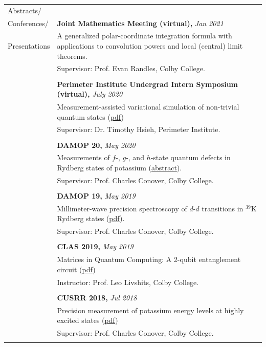 \documentclass[10pt]{article}
\begin{document}
\begin{longtable}{ l p{14.7cm}   }
\large{Abstracts/}   	& \\
\large{Conferences/}	& \textbf{Joint Mathematics Meeting (virtual),} \textit{Jan 2021}\\
\large{Presentations}	& A generalized polar-coordinate integration formula with applications to convolution powers and local (central) limit theorems.\\
	& Supervisor: Prof. Evan Randles, Colby College. \\
	&\\
	& \textbf{Perimeter Institute Undergrad Intern Symposium (virtual),} \textit{July 2020}\\
	& Measurement-assisted variational simulation of non-trivial quantum states (\href{https://huanqbui.com/LaTeX 20projects/HuanBui_Perimeter/Presentation/MBQC_as_Simulation.pdf}{{pdf}})\\
& Supervisor: Dr. Timothy Hsieh, Perimeter Institute. \\
	&\\
	& \textbf{DAMOP 20,} \textit{May 2020}\\
	& Measurements of $f$-, $g$-, and $h$-state quantum defects in Rydberg states of potassium (\href{http://meetings.aps.org/Meeting/DAMOP20/Session/K01.17}{abstract}).\\
	& Supervisor: Prof. Charles Conover, Colby College.\\
	&\\
	& \textbf{DAMOP 19,} \textit{May 2019} \\
	& Millimeter-wave precision spectroscopy of $d$-$d$ transitions in $^{\text{39}}$K Rydberg states (\href{https://huanqbui.com/research/DAMOP19 20poster/DAMOP19.pdf}{{pdf}}).\\
	& Supervisor: Prof. Charles Conover, Colby College.\\
	& \\
	& \textbf{CLAS 2019,} \textit{May 2019}\\
	& Matrices in Quantum Computing: A 2-qubit entanglement circuit (\href{https://huanqbui.com/LaTeX 20projects/Matrix_Analysis/CLAS 202019/Quantum-Circuit.pdf}{{pdf}})\\
	& Instructor: Prof. Leo Livshits, Colby College.\\
	&\\
	& \textbf{CUSRR 2018,} \textit{Jul 2018}\\
	& Precision measurement of potassium energy levels at highly excited states (\href{https://huanqbui.com/research/CUSRR2018.pdf}{{pdf}})\\
	& Supervisor: Prof. Charles Conover, Colby College.\\
	& \\ 
	

\end{longtable}
\end{document}
